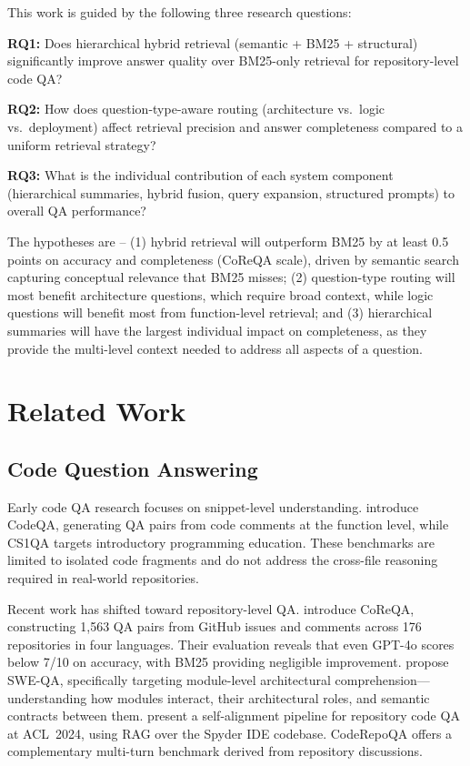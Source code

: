 \documentclass[11pt]{article}
\begin{document}
This work is guided by the following three research questions:

\noindent\textbf{RQ1:} Does hierarchical hybrid retrieval (semantic + BM25 + structural) significantly improve answer quality over BM25-only retrieval for repository-level code QA?

\noindent\textbf{RQ2:} How does question-type-aware routing (architecture vs.\ logic vs.\ deployment) affect retrieval precision and answer completeness compared to a uniform retrieval strategy?

\noindent\textbf{RQ3:} What is the individual contribution of each system component (hierarchical summaries, hybrid fusion, query expansion, structured prompts) to overall QA performance?

The hypotheses are -- (1) hybrid retrieval will outperform BM25 by at least 0.5 points on accuracy and completeness (CoReQA scale), driven by semantic search capturing conceptual relevance that BM25 misses; (2) question-type routing will most benefit architecture questions, which require broad context, while logic questions will benefit most from function-level retrieval; and (3) hierarchical summaries will have the largest individual impact on completeness, as they provide the multi-level context needed to address all aspects of a question.

\section{Related Work}

\subsection{Code Question Answering}

Early code QA research focuses on snippet-level understanding. \citet{liu2021codeqa} introduce CodeQA, generating QA pairs from code comments at the function level, while CS1QA \citep{lee2022cs1qa} targets introductory programming education. These benchmarks are limited to isolated code fragments and do not address the cross-file reasoning required in real-world repositories.

Recent work has shifted toward repository-level QA. \citet{chen2025coreqa} introduce CoReQA, constructing 1,563 QA pairs from GitHub issues and comments across 176 repositories in four languages. Their evaluation reveals that even GPT-4o scores below 7/10 on accuracy, with BM25 providing negligible improvement. \citet{peng2025sweqa} propose SWE-QA, specifically targeting module-level architectural comprehension---understanding how modules interact, their architectural roles, and semantic contracts between them. \citet{strich2024improving} present a self-alignment pipeline for repository code QA at ACL~2024, using RAG over the Spyder IDE codebase. CodeRepoQA \citep{coderepoqa2024} offers a complementary multi-turn benchmark derived from repository discussions.
\end{document}
